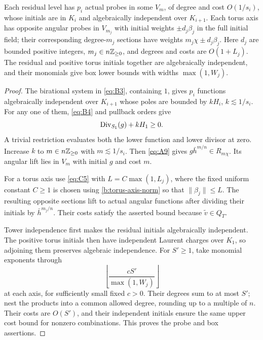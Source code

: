 \begin{proposition}\label{b:actual-probes}
Each residual level has \(p_i\) actual probes in some \(V_m\),
of degree and cost \(O(1/s_i)\), whose initials are in \(K_i\)
and algebraically independent over \(K_{i+1}\).
Each torus axis has opposite angular probes in $V_{m_j}$ with initial
weights $\pm d_j\beta_j$ in the full initial field; their corresponding
degree-$m_j$ sections have weights $m_j\chi\pm d_j\beta_j$.
Here \(d_j\) are bounded positive integers,
\(m_j\in n\mathbb Z_{\ge0}\), and degrees and costs are \(O(1+L_j)\). The residual and positive torus initials together
are algebraically independent, and their monomials give box
lower bounds with widths \(\max(1,W_j)\).
\end{proposition}

\begin{proof}
The birational system in \eqref{eq:B3}, containing \(1\), gives
\(p_i\) functions algebraically independent over \(K_{i+1}\)
whose poles are bounded by \(kH_i\), \(k\lesssim1/s_i\).
For any one of them, \eqref{eq:B4} and pullback orders give
\[
             \operatorname{Div}_{S_1}(g)+kH_1\ge0.
\]
A trivial restriction evaluates both the lower function and
lower divisor at zero. Increase \(k\) to
\(m\in n\mathbb Z_{\ge0}\) with \(m\lesssim1/s_i\).
Then \eqref{eq:A9} gives \(g\bar h^{m/n}\in R_{m\chi}\).
Its angular lift lies in \(V_m\) with initial \(g\) and cost \(m\).

For a torus axis use \eqref{eq:C5} with
\(L=C\max(1,L_j)\), where the fixed uniform constant \(C\ge1\)
is chosen using \eqref{b:torus-axis-norm} so that \(\|\beta_j\|\le L\).
The resulting opposite sections lift to
actual angular functions after dividing their initials by
\(\bar h^{m_j/n}\). Their costs satisfy the asserted bound
because \(\widetilde v\in Q_T\).

Tower independence first makes the residual initials
algebraically independent. The positive torus initials then
have independent Laurent charges over \(K_1\), so adjoining
them preserves algebraic independence. For \(S'\ge1\),
take monomial exponents through
\[
                  \left\lfloor
                         \frac{cS'}{\max(1,W_j)}
                    \right\rfloor
\]
at each axis, for sufficiently small fixed \(c>0\).
Their degrees sum to at most \(S'\); nest the products into
a common allowed degree, rounding up to a multiple of \(n\).
Their costs are \(O(S')\), and their independent initials
ensure the same upper cost bound for nonzero combinations.
This proves the probe and box assertions.
\end{proof}
